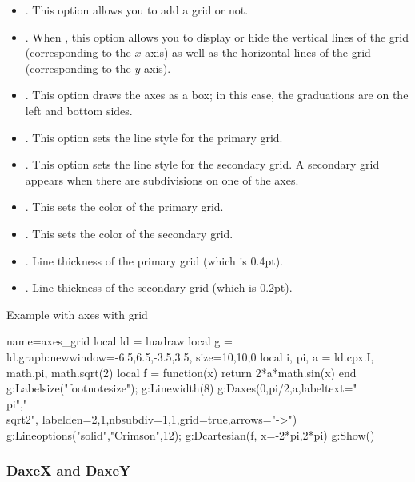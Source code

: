 \begin{itemize}
\begin{itemize}
        \item {}. This option allows you to add a grid or not.

        \item {}. When , this option allows you to display or hide the vertical lines of the grid (corresponding to the $x$ axis) as well as the horizontal lines of the grid (corresponding to the $y$ axis).

        \item {}. This option draws the axes as a box; in this case, the graduations are on the left and bottom sides.

        \item {}. This option sets the line style for the primary grid.
        \item {}. This option sets the line style for the secondary grid. A secondary grid appears when there are subdivisions on one of the axes.
        \item {}. This sets the color of the primary grid.
        \item {}. This sets the color of the secondary grid.
        \item {}. Line thickness of the primary grid (which is 0.4pt).
        \item {}. Line thickness of the secondary grid (which is 0.2pt).
    \end{itemize}
\end{itemize}


\begin{demo}{Example with axes with grid}
\begin{luadraw}{name=axes_grid}
local ld = luadraw
local g = ld.graph:new{window={-6.5,6.5,-3.5,3.5}, size={10,10,0}}
local i, pi, a = ld.cpx.I, math.pi, math.sqrt(2)
local f = function(x) return 2*a*math.sin(x) end
g:Labelsize("footnotesize"); g:Linewidth(8)
g:Daxes({0,pi/2,a},{labeltext={"\\pi","\\sqrt{2}"}, labelden={2,1},nbsubdiv={1,1},grid=true,arrows="->"})
g:Lineoptions("solid","Crimson",12); g:Dcartesian(f, {x={-2*pi,2*pi}})
g:Show()
\end{luadraw}
\end{demo}

\subsubsection{DaxeX and DaxeY}


